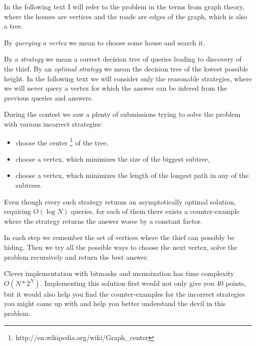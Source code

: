 


In the following text I will refer to the problem in the terms from graph theory,
where the houses are vertices and the roads are edges of the graph, which is also a
tree.

By \emph{querying a vertex} we mean to choose some house and search it.

By a \emph{strategy} we mean a correct decision tree of queries leading to discovery of the thief.
By an \emph{optimal strategy} we mean the decision tree of the lowest possible height.
In the following text we will consider only the reasonable strategies, where
we will never query a vertex for which the answer can be infered from the previous queries and answers.



During the contest we saw a plenty of submissions trying to solve the problem
with various incorrect strategies:
\begin{itemize}
\item choose the center \footnote{http://en.wikipedia.org/wiki/Graph_center} of the tree,
\item choose a vertex, which minimizes the size of the biggest subtree,
\item choose a vertex, which minimizes the length of the longest path in any of the subtrees.
\end{itemize}

Even though every such strategy returns an asymptotically optimal solution,
requiring $O(\log N)$ queries, for each of them there exists a counter-example
where the strategy returns the answer worse by a constant factor.



In each step we remember the set of vertices where the thief can possibly be hiding.
Then we try all the possible ways to choose the next vertex, solve the problem
recursively and return the best answer.

Clever implementation with bitmasks and memoization has time complexity $O(N*2^N)$.
Implementing this solution first would not only give you 40 points, but it would also
help you find the counter-examples for the incorrect strategies you might come
up with and help you better understand the devil in this problem.


